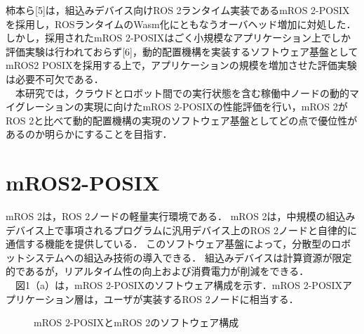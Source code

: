 \documentclass[11pt]{ujarticle}
\begin{document}
柿本ら[5]は，組込みデバイス向けROS 2ランタイム実装であるmROS 2-POSIXを採用し，ROSランタイムのWasm化にともなうオーバヘッド増加に対処した．
しかし，採用されたmROS 2-POSIXはごく小規模なアプリケーション上でしか評価実験は行われておらず[6]，動的配置機構を実装するソフトウェア基盤としてmROS2 POSIXを採用する上で，アプリケーションの規模を増加させた評価実験は必要不可欠である．
\\　本研究では，クラウドとロボット間での実行状態を含む稼働中ノードの動的マイグレーションの実現に向けたmROS 2-POSIXの性能評価を行い，mROS 2がROS 2と比べて動的配置機構の実現のソフトウェア基盤としてどの点で優位性があるのか明らかにすることを目指す．



\section{mROS2-POSIX}
mROS 2は，ROS 2ノードの軽量実行環境である．
mROS 2は，中規模の組込みデバイス上で事項されるプログラムに汎用デバイス上のROS 2ノードと自律的に通信する機能を提供している．
このソフトウェア基盤によって，分散型のロボットシステムへの組込み技術の導入できる．
組込みデバイスは計算資源が限定的であるが，リアルタイム性の向上および消費電力が削減をできる．
\\　図1（a）は，mROS 2-POSIXのソフトウェア構成を示す．mROS 2-POSIXアプリケーション層は，ユーザが実装するROS 2ノードに相当する．
\begin{figure}[t]
	\centering
	\begin{minipage}{.5\textwidth}
		\centering
		\hfill
	\end{minipage}
	\caption{mROS 2-POSIXとmROS 2のソフトウェア構成}
	
\end{figure}
\end{document}
